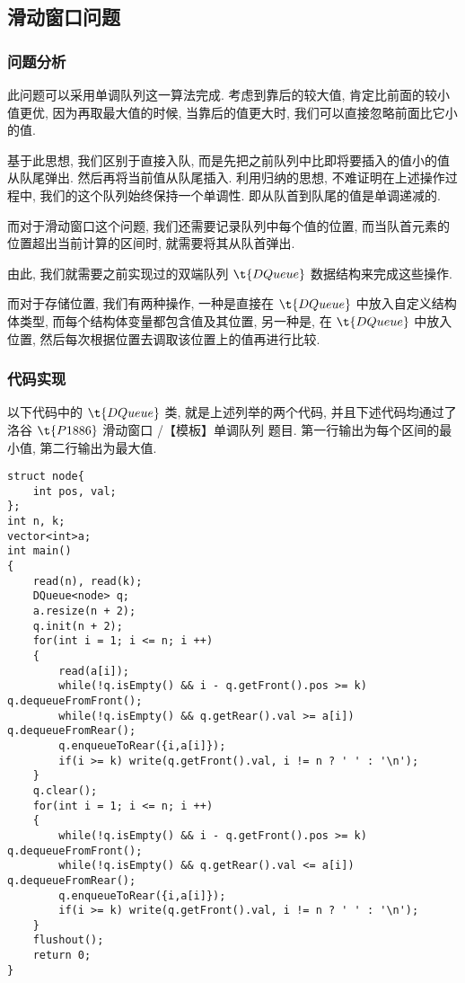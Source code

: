 \subsection{滑动窗口问题}

\subsubsection{问题分析}

此问题可以采用单调队列这一算法完成. 考虑到靠后的较大值, 肯定比前面的较小值更优, 因为再取最大值的时候, 当靠后的值更大时, 我们可以直接忽略前面比它小的值.

基于此思想, 我们区别于直接入队, 而是先把之前队列中比即将要插入的值小的值从队尾弹出. 然后再将当前值从队尾插入. 利用归纳的思想, 不难证明在上述操作过程中, 我们的这个队列始终保持一个单调性. 即从队首到队尾的值是单调递减的.

而对于滑动窗口这个问题, 我们还需要记录队列中每个值的位置, 而当队首元素的位置超出当前计算的区间时, 就需要将其从队首弹出.

由此, 我们就需要之前实现过的双端队列 $\t{DQueue}$ 数据结构来完成这些操作.

而对于存储位置, 我们有两种操作, 一种是直接在 $\t{DQueue}$ 中放入自定义结构体类型, 而每个结构体变量都包含值及其位置, 另一种是, 在 $\t{DQueue}$ 中放入位置, 然后每次根据位置去调取该位置上的值再进行比较.

\subsubsection{代码实现}
以下代码中的 $\t{DQueue}$ 类, 就是上述列举的两个代码, 并且下述代码均通过了洛谷 $\t{P1886}$  滑动窗口 /【模板】单调队列 题目. 第一行输出为每个区间的最小值, 第二行输出为最大值.

\begin{lstlisting}
struct node{
	int pos, val;
};
int n, k;
vector<int>a;
int main()
{
	read(n), read(k);
	DQueue<node> q;
	a.resize(n + 2);
	q.init(n + 2); 
	for(int i = 1; i <= n; i ++)
	{
		read(a[i]);
		while(!q.isEmpty() && i - q.getFront().pos >= k) q.dequeueFromFront();
		while(!q.isEmpty() && q.getRear().val >= a[i]) q.dequeueFromRear();
		q.enqueueToRear({i,a[i]});
		if(i >= k) write(q.getFront().val, i != n ? ' ' : '\n'); 
	}
	q.clear();
	for(int i = 1; i <= n; i ++)
	{
		while(!q.isEmpty() && i - q.getFront().pos >= k) q.dequeueFromFront();
		while(!q.isEmpty() && q.getRear().val <= a[i]) q.dequeueFromRear();
		q.enqueueToRear({i,a[i]});
		if(i >= k) write(q.getFront().val, i != n ? ' ' : '\n');
	}
	flushout();
	return 0;
}
\end{lstlisting}

